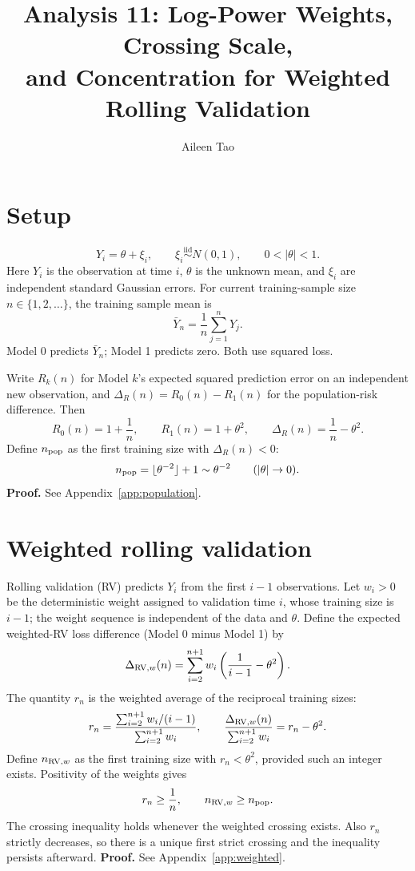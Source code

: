\documentclass[11pt]{article}
\title{Analysis 11: Log-Power Weights, Crossing Scale,\\
and Concentration for Weighted Rolling Validation}
\author{Aileen Tao}
\date{}
\theoremstyle{definition}
\begin{document}
\maketitle

\section{Setup}
\[
Y_i=\theta+\xi_i,\qquad \xi_i\stackrel{\mathrm{iid}}{\sim}N(0,1),
\qquad 0<|\theta|<1.
\]
Here $Y_i$ is the observation at time $i$, $\theta$ is the unknown mean,
and $\xi_i$ are independent standard Gaussian errors. For current
training-sample size $n\in\{1,2,\ldots\}$, the training sample mean is
\[
\bar Y_n=\frac1n\sum_{j=1}^nY_j.
\]
Model 0 predicts $\bar Y_n$; Model 1 predicts zero. Both use squared loss.

Write $R_k(n)$ for Model $k$'s expected squared prediction error on
an independent new observation, and $\Delta_R(n)=R_0(n)-R_1(n)$
for the population-risk difference. Then
\[
R_0(n)=1+\frac1n,\qquad R_1(n)=1+\theta^2,\qquad
\Delta_R(n)=\frac1n-\theta^2.
\]
Define $n_{\rm pop}$ as the first training size with $\Delta_R(n)<0$:
\[
n_{\rm pop}=\lfloor\theta^{-2}\rfloor+1\sim\theta^{-2}\qquad(|\theta|\to0).
\]
\textbf{Proof.} See Appendix~\ref{app:population}.

\section{Weighted rolling validation}
Rolling validation (RV) predicts $Y_i$ from the first $i-1$
observations. Let $w_i>0$ be the deterministic weight assigned to
validation time $i$, whose training size is $i-1$; the weight sequence
is independent of the data and $\theta$.
Define the expected weighted-RV loss difference (Model 0 minus Model 1) by
\[
\Delta_{{\rm RV},w}(n)
=\sum_{i=2}^{n+1}w_i\left(\frac1{i-1}-\theta^2\right).
\]
The quantity $r_n$ is the weighted average of the reciprocal training sizes:
\[
r_n=\frac{\sum_{i=2}^{n+1}w_i/(i-1)}{\sum_{i=2}^{n+1}w_i},
\qquad
\frac{\Delta_{{\rm RV},w}(n)}{\sum_{i=2}^{n+1}w_i}
=r_n-\theta^2.
\]
Define $n_{{\rm RV},w}$ as the first training size with
$r_n<\theta^2$, provided such an integer exists. Positivity of the
weights gives
\[
r_n\ge\frac1n,\qquad n_{{\rm RV},w}\ge n_{\rm pop}.
\]
The crossing inequality holds whenever the weighted crossing exists.
Also $r_n$ strictly decreases, so there is a unique first strict crossing
and the inequality persists afterward.
\textbf{Proof.} See Appendix~\ref{app:weighted}.
\end{document}
